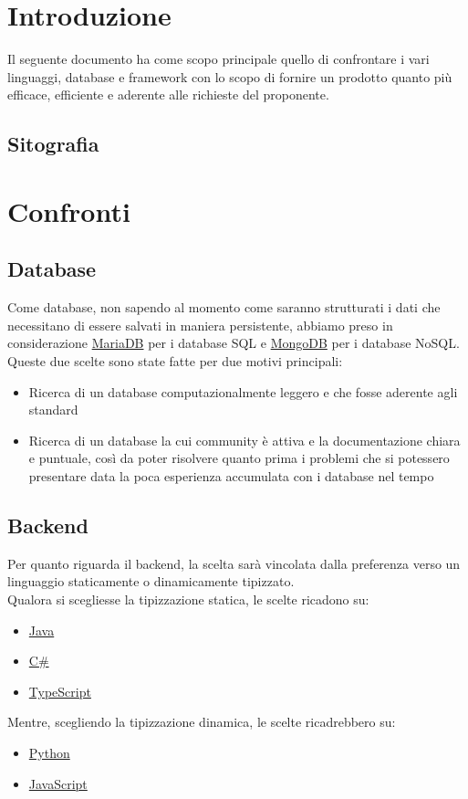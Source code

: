 \documentclass[a4paper, 12pt]{article}
\begin{document}
\makeindexdetails
\makefrontpage \makeversioni
\tableofcontents
\newpage
\clearpage
{}
\newpage
\section{Introduzione}
Il seguente documento ha come scopo principale quello di confrontare i vari linguaggi, database e framework con lo scopo di fornire un prodotto quanto più efficace, efficiente e aderente alle richieste del proponente.\\
\subsection{Sitografia}

\newpage
\section{Confronti}
\subsection{Database}
Come database, non sapendo al momento come saranno strutturati i dati che necessitano di essere salvati in maniera persistente, abbiamo preso in considerazione \href{https://mariadb.org/}{MariaDB} per i database SQL e \href{https://www.mongodb.com/}{MongoDB} per i database NoSQL. \\
Queste due scelte sono state fatte per due motivi principali:
\begin{itemize}
    \item Ricerca di un database computazionalmente leggero e che fosse aderente agli standard
    \item Ricerca di un database la cui community è attiva e la documentazione chiara e puntuale, così da poter risolvere quanto prima i problemi che si potessero presentare data la poca esperienza accumulata con i database nel tempo
\end{itemize}
\subsection{Backend}
Per quanto riguarda il backend, la scelta sarà vincolata dalla preferenza verso un linguaggio staticamente o dinamicamente tipizzato. \\
Qualora si scegliesse la tipizzazione statica, le scelte ricadono su:
\begin{itemize}
    \item \href{https://www.java.com/it/}{Java}
    \item \href{https://learn.microsoft.com/en-us/dotnet/csharp/}{C\#}
    \item \href{https://www.typescriptlang.org/}{TypeScript}
\end{itemize}
Mentre, scegliendo la tipizzazione dinamica, le scelte ricadrebbero su:
\begin{itemize}
    \item \href{https://www.python.org/}{Python}
    \item \href{https://www.javascript.com/}{JavaScript}
\end{itemize}
\end{document}
